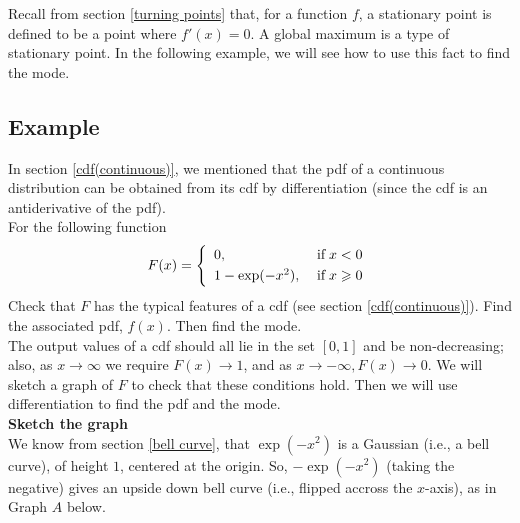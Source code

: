 \noindent Recall from section \ref{turning points} that, for a function $f$, a stationary point is defined to be a point where $f'(x) = 0$. A global maximum is a type of stationary point. In the following example, we will see how to use this fact to find the mode.

\subsection{Example}
In section \ref{cdf(continuous)}, we mentioned that the pdf of a continuous distribution can be obtained from its cdf by differentiation (since the cdf is an antiderivative of the pdf). \\

\noindent For the following function
\[
F(x) = \left\{ \begin{array}{ll}
0, & \; \text{if} \; x < 0 \smallskip \\
1 - \exp(-x^2), & \; \text{if} \; x \geq 0
\end{array} \right.
\]
Check that $F$ has the typical features of a cdf (see section \ref{cdf(continuous)}). Find the associated pdf, $f(x)$. Then find the mode. \\

\solution
The output values of a cdf should all lie in the set $[0,1]$ and be non-decreasing; also, as $x \rightarrow \infty$ we require $F(x) \rightarrow 1$, and as $x \rightarrow -\infty, F(x) \rightarrow 0$. We will sketch a graph of $F$ to check that these conditions hold. Then we will use differentiation to find the pdf and the mode. \\

\noindent \textbf{Sketch the graph} \\
\noindent We know from section \ref{bell curve}, that $\exp(-x^2)$ is a Gaussian (i.e., a bell curve), of height $1$, centered at the origin. So, $-\exp(-x^2)$ (taking the negative) gives an upside down bell curve (i.e., flipped accross the $x$-axis), as in Graph $A$ below. \\

